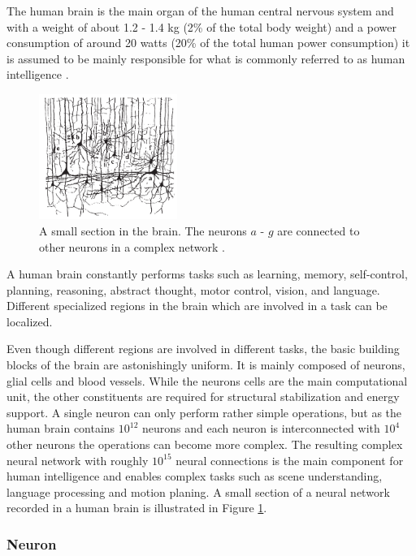 The human brain is the main organ of the human central nervous system and with a weight of about 1.2 - 1.4 kg (2\% of the total body weight) and a power consumption of around 20 watts (20\% of the total human power consumption) it is assumed to be mainly responsible for what is commonly referred to as human intelligence \cite{Byrne1997, gerstner2014neuronal}.  

\begin{figure}
	\centering
    	\includegraphics[width=0.4\textwidth]{imgs/brain.png} 
    \caption[A small section in the brain.]{A small section in the brain. The neurons $a$ - $g$ are connected to other neurons in a complex network \cite{gerstner2014neuronal}.}
	\label{fig:brain}
\end{figure}

A human brain constantly performs tasks such as learning, memory, self-control, planning, reasoning, abstract thought, motor control, vision, and language.
Different specialized regions in the brain which are involved in a task can be localized. 

Even though different regions are involved in different tasks, the basic building blocks of the brain are astonishingly uniform. 
It is mainly composed of neurons, glial cells and blood vessels.
While the neurons cells are the main computational unit, the other constituents are required for structural stabilization and energy support.
A single neuron can only perform rather simple operations, but as the human brain contains $10^{12}$ neurons and each neuron is interconnected with $10^{4}$ other neurons the operations can become more complex.
The resulting complex neural network with roughly $10^{15}$ neural connections is the main component for human intelligence and enables complex tasks such as scene understanding, language processing and motion planing. A small section of a neural network recorded in a human brain is illustrated in Figure \ref{fig:brain}. 

\subsubsection{Neuron} \label{c:natneuron}

